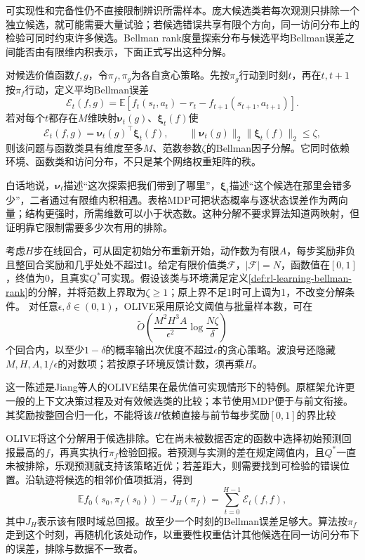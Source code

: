 可实现性和完备性仍不直接限制辨识所需样本。庞大候选类若每次观测只排除一个独立候选，就可能需要大量试验；若候选错误共享有限个方向，同一访问分布上的检验可同时约束许多候选。Bellman rank度量探索分布与候选平均Bellman误差之间能否由有限维内积表示，下面正式写出这种分解。

\begin{definition}[一种Bellman因子分解]
  \label{def:rl-learning-bellman-rank}
  对候选价值函数$f,g$，令$\pi_f,\pi_g$为各自贪心策略。先按$\pi_g$行动到时刻$t$，再在$t,t+1$按$\pi_f$行动，定义平均Bellman误差
  \[
    \mathcal E_t(f,g)
     =\mathbb E[
        f_t(s_t,a_t)-r_t-f_{t+1}(s_{t+1},a_{t+1})].
  \]
  若对每个$t$都存在$M$维映射$\bm\nu_t(g)$、$\bm\xi_t(f)$使
  \[
    \mathcal E_t(f,g)=\bm\nu_t(g)^\top\bm\xi_t(f),\qquad
    \|\bm\nu_t(g)\|_2\|\bm\xi_t(f)\|_2\leq\zeta,
  \]
  则该问题与函数类具有维度至多$M$、范数参数$\zeta$的Bellman因子分解。它同时依赖环境、函数类和访问分布，不只是某个网络权重矩阵的秩。
\end{definition}

白话地说，$\bm\nu_t$描述“这次探索把我们带到了哪里”，$\bm\xi_t$描述“这个候选在那里会错多少”，二者通过有限维内积相遇。表格MDP可把状态概率与逐状态误差作为两向量；结构更强时，所需维数可以小于状态数。这种分解不要求算法知道两映射，但证明靠它限制需要多少次有用的排除。

\begin{theorem}
  \label{thm:rl-learning-olive}
  考虑$H$步在线回合，可从固定初始分布重新开始，动作数为有限$A$，每步奖励非负且整回合奖励和几乎处处不超过1。给定有限价值类$\mathcal F$，$|\mathcal F|=N$，函数值在$[0,1]$，终值为0，且真实$Q^*$可实现。假设该类与环境满足定义\ref{def:rl-learning-bellman-rank}的分解，并将范数上界取为$\zeta\geq1$；原上界不足1时可上调为1，不改变分解条件。
  对任意$\epsilon,\delta\in(0,1)$，OLIVE采用原论文阈值与批量样本数，可在
  \[
    \widetilde O\left(
       \frac{M^2H^3A}{\epsilon^2}
                         \log\frac{N\zeta}{\delta}\right)
  \]
  个回合内，以至少$1-\delta$的概率输出次优度不超过$\epsilon$的贪心策略。波浪号还隐藏$M,H,A,1/\epsilon$的对数项；若按原子环境反馈计数，须再乘$H$。
\end{theorem}

这一陈述是Jiang等人的OLIVE结果在最优值可实现情形下的特例。原框架允许更一般的上下文决策过程及对有效候选类的比较；本节使用MDP便于与前文衔接。其奖励按整回合归一化，不能将该$H$依赖直接与前节每步奖励$[0,1]$的界比较

OLIVE将这个分解用于候选排除。它在尚未被数据否定的函数中选择初始预测回报最高的$f$，再真实执行$\pi_f$检验回报。若预测与实测的差在规定阈值内，且$Q^*$一直未被排除，乐观预测就支持该策略近优；若差距大，则需要找到可检验的错误位置。沿轨迹将候选的相邻价值项抵消，得到
\[
 \mathbb E f_0(s_0,\pi_f(s_0))-J_H(\pi_f)
                 =\sum_{t=0}^{H-1}\mathcal E_t(f,f),
\]
其中$J_H$表示该有限时域总回报。故至少一个时刻的Bellman误差足够大。算法按$\pi_f$走到这个时刻，再随机化该处动作，以重要性权重估计其他候选在同一访问分布下的误差，排除与数据不一致者。

